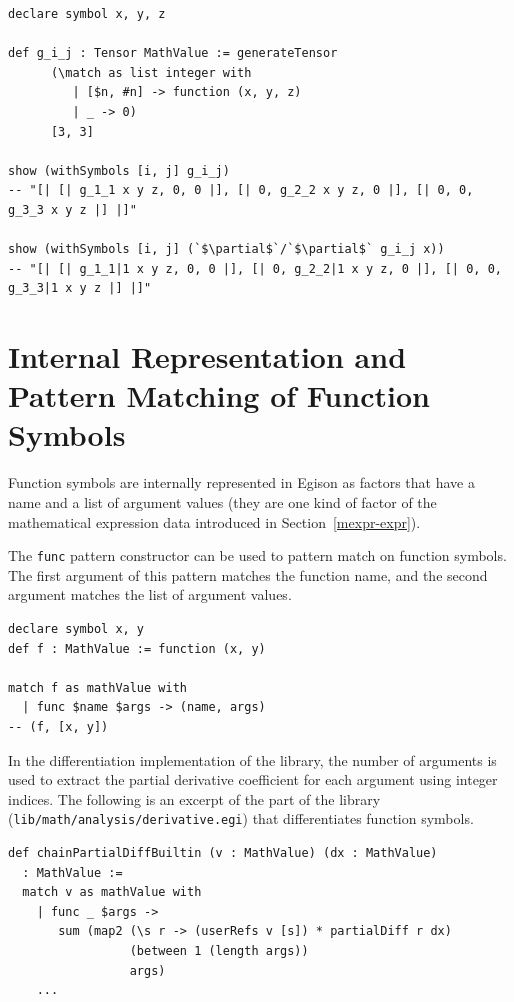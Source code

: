 \begin{lstlisting}[language=egison,numbers=none]
declare symbol x, y, z

def g_i_j : Tensor MathValue := generateTensor
      (\match as list integer with
         | [$n, #n] -> function (x, y, z)
         | _ -> 0)
      [3, 3]

show (withSymbols [i, j] g_i_j)
-- "[| [| g_1_1 x y z, 0, 0 |], [| 0, g_2_2 x y z, 0 |], [| 0, 0, g_3_3 x y z |] |]"

show (withSymbols [i, j] (`$\partial$`/`$\partial$` g_i_j x))
-- "[| [| g_1_1|1 x y z, 0, 0 |], [| 0, g_2_2|1 x y z, 0 |], [| 0, 0, g_3_3|1 x y z |] |]"
\end{lstlisting}

\section{Internal Representation and Pattern Matching of Function Symbols}\label{funcsym-data}

Function symbols are internally represented in Egison as factors that have a name and a list of argument values (they are one kind of factor of the mathematical expression data introduced in Section~\ref{mexpr-expr}).

The \lstinline{func} pattern constructor can be used to pattern match on function symbols.
The first argument of this pattern matches the function name, and the second argument matches the list of argument values.

\begin{lstlisting}[language=egison,numbers=none]
declare symbol x, y
def f : MathValue := function (x, y)

match f as mathValue with
  | func $name $args -> (name, args)
-- (f, [x, y])
\end{lstlisting}

In the differentiation implementation of the library, the number of arguments is used to extract the partial derivative coefficient for each argument using integer indices.
The following is an excerpt of the part of the library (\texttt{lib/math/analysis/derivative.egi}) that differentiates function symbols.

\begin{lstlisting}[language=egison,numbers=none]
def chainPartialDiffBuiltin (v : MathValue) (dx : MathValue)
  : MathValue :=
  match v as mathValue with
    | func _ $args ->
       sum (map2 (\s r -> (userRefs v [s]) * partialDiff r dx)
                 (between 1 (length args))
                 args)
    ...
\end{lstlisting}

